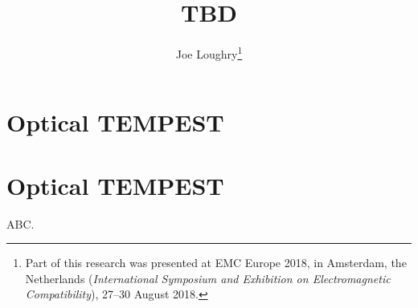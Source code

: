 \documentclass[a4paper,twoside]{book}
\begin{document}
\chapter{Optical TEMPEST}
\title{TBD}
\author{Joe Loughry\thanks{Part of this research was presented at EMC
Europe 2018, in Amsterdam, the Netherlands (\emph{International Symposium and
Exhibition on Electromagnetic Compatibility}), 27--30 August 2018.}}
\maketitle
\chapter{Optical TEMPEST}
ABC\cite{Loughry2018a}.


\end{document}
